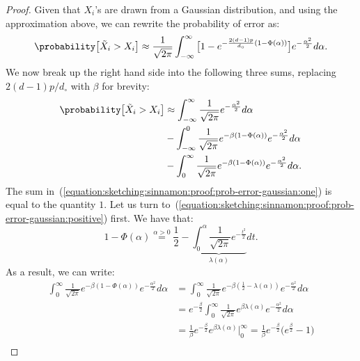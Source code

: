 \begin{proof}
    Given that $X_i$'s are drawn from a Gaussian distribution,
    and using the approximation above, we can rewrite the probability of error as:
    \begin{equation*}
        \probability\big[ \tilde{X}_i > X_i \big] \approx
        \frac{1}{\sqrt{2\pi}} \int_{-\infty}^{\infty} {\big[ 1 - e^{-\frac{2(d - 1)p}{d_\circ} (1 - \Phi(\alpha))} \big] e^{-\frac{\alpha^2}{2}} d\alpha}.
    \end{equation*}
    We now break up the right hand side into the following three sums,
    replacing $2(d - 1)p/d_\circ$ with $\beta$ for brevity:
    \begin{align}
        \probability\big[ \tilde{X}_i > X_i \big] &\approx
        \int_{-\infty}^{\infty} \frac{1}{\sqrt{2\pi}} e^{-\frac{\alpha^2}{2}} d\alpha \label{equation:sketching:sinnamon:proof:prob-error-gaussian:one} \\
        & - \int_{-\infty}^{0} \frac{1}{\sqrt{2\pi}} e^{-\beta (1 - \Phi(\alpha))} e^{-\frac{\alpha^2}{2}} d\alpha \label{equation:sketching:sinnamon:proof:prob-error-gaussian:negative} \\
        & - \int_{0}^{\infty} \frac{1}{\sqrt{2\pi}} e^{-\beta (1 - \Phi(\alpha))} e^{-\frac{\alpha^2}{2}} d\alpha \label{equation:sketching:sinnamon:proof:prob-error-gaussian:positive}.
    \end{align}
    The sum in~(\ref{equation:sketching:sinnamon:proof:prob-error-gaussian:one}) is equal to the quantity $1$. Let us turn to~(\ref{equation:sketching:sinnamon:proof:prob-error-gaussian:positive}) first. We have that:
    \begin{equation*}
        1 - \Phi(\alpha) \overset{\alpha > 0}{=} \frac{1}{2} - \underbrace{\int_{0}^{\alpha} \frac{1}{\sqrt{2\pi}} e^{-\frac{t^2}{2}}}_{\lambda(\alpha)} dt.
    \end{equation*}
    As a result, we can write:
    \begin{align*}
        \int_{0}^{\infty} \frac{1}{\sqrt{2\pi}} e^{-\beta (1 - \Phi(\alpha))} e^{-\frac{\alpha^2}{2}} d\alpha &= \int_{0}^{\infty} \frac{1}{\sqrt{2\pi}} e^{-\beta (\frac{1}{2} - \lambda(\alpha))} e^{-\frac{\alpha^2}{2}} d\alpha \nonumber \\
        &= e^{-\frac{\beta}{2}} \int_{0}^{\infty} \frac{1}{\sqrt{2\pi}} e^{\beta \lambda(\alpha)} e^{-\frac{\alpha^2}{2}} d\alpha \nonumber \\
        &= \frac{1}{\beta} e^{-\frac{\beta}{2}} e^{\beta\lambda(\alpha)} \big|_{0}^{\infty} = \frac{1}{\beta} e^{-\frac{\beta}{2}} \big( e^\frac{\beta}{2} - 1 \big) \nonumber \\

\end{align*}
\end{proof}
